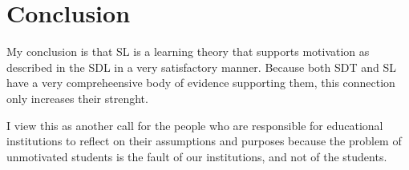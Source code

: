 \section{Conclusion}

My conclusion is that SL is a learning theory that supports motivation as
described in the SDL in a very satisfactory manner. Because both SDT and SL have
a very compreheensive body of evidence supporting them, this connection only
increases their strenght.

I view this as another call for the people who are responsible for educational
institutions to reflect on their assumptions and purposes because the
problem of unmotivated students is the fault of our institutions, and not of the
students.\cite{education:joseph_phyllis__pbl}
